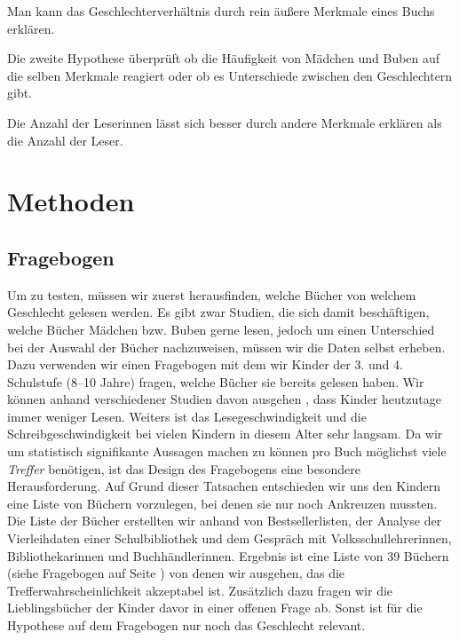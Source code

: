 \begin{hyp}\label{h5}
    Man kann das Geschlechterverhältnis durch rein äußere Merkmale eines Buchs erklären.
\end{hyp}

Die zweite Hypothese überprüft ob die Häufigkeit von Mädchen und Buben
auf die selben Merkmale reagiert oder ob es Unterschiede zwischen den
Geschlechtern gibt.

\begin{subhyp}\label{h5.1}
    Die Anzahl der Leserinnen lässt sich besser durch andere Merkmale erklären als die Anzahl der Leser.
\end{subhyp}

\section{Methoden}

\subsection{Fragebogen}

Um  zu testen, müssen wir zuerst herausfinden, welche
Bücher von welchem Geschlecht gelesen werden. Es gibt zwar Studien, die
sich damit beschäftigen, welche Bücher Mädchen bzw. Buben gerne lesen,
jedoch um einen Unterschied bei der Auswahl der Bücher nachzuweisen,
müssen wir die Daten selbst erheben. Dazu verwenden wir einen Fragebogen
mit dem wir Kinder der 3. und 4. Schulstufe (8--10 Jahre) fragen, welche
Bücher sie bereits gelesen haben. Wir können anhand verschiedener
Studien davon ausgehen , dass Kinder heutzutage immer weniger Lesen.
Weiters ist das Lesegeschwindigkeit und die Schreibgeschwindigkeit bei
vielen Kindern in diesem Alter sehr langsam. Da wir um statistisch
signifikante Aussagen machen zu können pro Buch möglichst viele
\emph{Treffer} benötigen, ist das Design des Fragebogens eine besondere
Herausforderung. Auf Grund dieser Tatsachen entschieden wir uns den
Kindern eine Liste von Büchern vorzulegen, bei denen sie nur noch
Ankreuzen mussten. Die Liste der Bücher erstellten wir anhand von
Bestsellerlisten, der Analyse der Vierleihdaten einer Schulbibliothek
und dem Gespräch mit Volksschullehrerinnen, Bibliothekarinnen und
Buchhändlerinnen. Ergebnis ist eine Liste von 39 Büchern (siehe
Fragebogen auf Seite \pageref{frabo2}) von denen wir ausgehen, das die
Trefferwahrscheinlichkeit akzeptabel ist. Zusätzlich dazu fragen wir die
Lieblingsbücher der Kinder davor in einer offenen Frage ab. Sonst ist
für die Hypothese auf dem Fragebogen nur noch das Geschlecht relevant.

